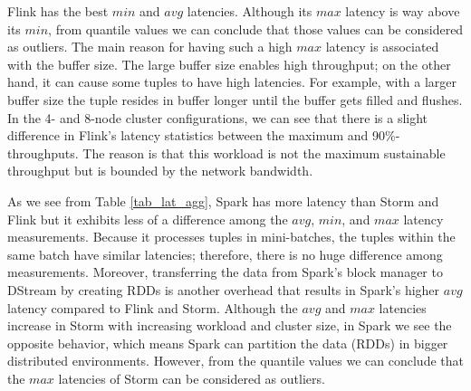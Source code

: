 Flink has the best $min$ and $avg$ latencies. Although its $max$ latency is way above its $min$, from quantile values we can conclude that those values can be considered as outliers. The main reason for having such a high $max$ latency is associated with the buffer size. The large buffer size enables high throughput; on the other hand, it can cause some tuples to have high latencies. For example, with a larger buffer size the tuple resides in buffer longer until the buffer gets filled and flushes. In the 4- and 8-node cluster configurations, we can see that there is a slight difference in Flink's latency statistics between  the maximum and 90\%-throughputs. The reason is that this workload is not the maximum sustainable throughput but is bounded by the network bandwidth. %
 
As we see from Table \ref{tab_lat_agg},  Spark has more latency than Storm and Flink but it exhibits less of a difference among the $avg$, $min$, and $max$ latency measurements. Because it processes tuples in mini-batches, the tuples within the same batch have similar latencies; therefore, there is no huge difference among measurements. Moreover, transferring the data from Spark's block manager to DStream by creating RDDs is another overhead that results in Spark's higher $avg$ latency compared to Flink and Storm.  Although the $avg$ and $max$ latencies increase in Storm with increasing workload and cluster size, in Spark we see the opposite behavior, which means Spark can partition the data (RDDs) in bigger distributed environments. However, from the quantile values we can conclude that the $max$ latencies of Storm  can be considered as outliers.








